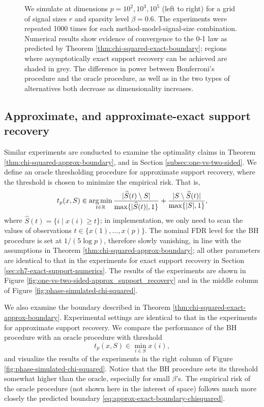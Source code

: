 \begin{figure}
{      We simulate at dimensions $p=10^2, 10^3, 10^5$ (left to right) for a grid of signal sizes $r$ and sparsity level $\beta=0.6$.
      The experiments were repeated 1000 times for each method-model-signal-size combination. 
      Numerical results show evidence of convergence to the 0-1 law as predicted by Theorem \ref{thm:chi-squared-exact-boundary}; regions where asymptotically exact support recovery can be achieved are shaded in grey.
      The difference in power between Bonferroni's procedure and the oracle procedure, as well as in the two types of alternatives both decrease as dimensionality increases.} 
      \label{fig:one-vs-two-sided-exact_support_recovery}
\end{figure}

\subsection{Approximate, and approximate-exact support recovery}

Similar experiments are conducted to examine the optimality claims in Theorem \ref{thm:chi-squared-approx-boundary}, and in Section \ref{subsec:one-vs-two-sided}.
We define an oracle thresholding procedure for approximate support recovery, where the threshold is chosen to minimize the empirical risk.
That is,
$$
t_p(x, S) \in \operatorname*{arg\,min}_{t\in\mathbb R} \frac{|\widehat{S}(t)\setminus S|}{\max\{|\widehat{S}(t)|,1\}} + \frac{|S\setminus \widehat{S}(t)|}{\max\{|{S}|,1\}},
$$
where $\widehat{S}(t) = \{i\;|\;x(i)\ge t\}$;
in implementation, we only need to scan the values of observations $t\in\{x(1), \ldots, x(p)\}$. 
The nominal FDR level for the BH procedure is set at $1/(5{\log{p}})$, therefore slowly vanishing, in line with the assumptions in Theorem \ref{thm:chi-squared-approx-boundary}; all other parameters are identical to that in the experiments for exact support recovery in 
Section \ref{sec:ch7-exact-support-numerics}.  The results of the experiments are shown in 
Figure \ref{fig:one-vs-two-sided-approx_support_recovery} and in the middle column of Figure \ref{fig:phase-simulated-chi-squared}.

We also examine the boundary described in Theorem \ref{thm:chi-squared-exact-approx-boundary}.
Experimental settings are identical to that in the experiments for approximate support recovery.
We compare the performance of the BH procedure with an oracle procedure with threshold
$$
t_p(x, S) \in \min_{i\in S} x(i),
$$
and visualize the results of the experiments in the right column of Figure \ref{fig:phase-simulated-chi-squared}.
Notice that the BH procedure sets its threshold somewhat higher than the oracle, especially for small $\beta$'s. 
The empirical risk of the oracle procedure (not shown here in the interest of space) follows much more closely the predicted boundary \eqref{eq:approx-exact-boundary-chisquared}.

